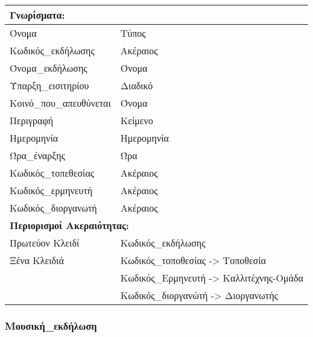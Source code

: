 \begin{tabular}{|p{6cm}|p{8cm}|}
  \multicolumn{2}{l}{\textbf{Γνωρίσματα:}}                          \\ \hline
  Όνομα                   & Τύπος                                   \\ \hline
  Κωδικός\_εκδήλωσης      & Ακέραιος                                \\ \hline
  Όνομα\_εκδήλωσης        & Όνομα                                   \\ \hline
  Ύπαρξη\_εισιτηρίου      & Διαδικό                                 \\ \hline
  Κοινό\_που\_απευθύνεται & Όνομα                                   \\ \hline
  Περιγραφή               & Κείμενο                                 \\ \hline
  Ημερομηνία              & Ημερομηνία                              \\ \hline
  Ώρα\_έναρξης            & Ώρα                                     \\ \hline
  Κωδικός\_τοπεθεσίας     & Ακέραιος                                \\ \hline
  Κωδικός\_ερμηνευτή      & Ακέραιος                                \\ \hline
  Κωδικός\_διοργανωτή     & Ακέραιος                                \\ \hline
  \multicolumn{2}{l}{\textbf{Περιορισμοί Ακεραιότητας:}}            \\ \hline
  Πρωτεύον Κλειδί         & Κωδικός\_εκδήλωσης                      \\ \hline
  Ξένα Κλειδιά            & Κωδικός\_τοποθεσίας -> Τοποθεσία        \\ \cline{2-2}
                          & Κωδικός\_Ερμηνευτή -> Καλλιτέχνης-Ομάδα \\ \cline{2-2}
                          & Κωδικός\_διοργανώτή -> Διοργανωτής      \\ \hline
\end{tabular}

\subsubsection*{Μουσική\_εκδήλωση}

